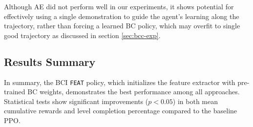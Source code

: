 \documentclass{article}
\begin{document}
Although AE did not perform well in our experiments, it shows potential 
for effectively using a single demonstration to guide the agent's 
learning along the trajectory, rather than forcing a learned BC policy, 
which may overfit to single good trajectory as discussed in section 
\ref{sec:bcc-exp}.


\subsection{Results Summary}

In summary, the BCI \texttt{FEAT} policy, which initializes the feature 
extractor with pre-trained BC weights, demonstrates the best performance 
among all approaches. Statistical tests show significant improvements 
($p < 0.05$) in both mean cumulative rewards and level completion 
percentage compared to the baseline PPO.


\begin{table}[htbp]
      \centering
      \caption{Performance of all policies.}
      \label{tab:res}
\end{table}
\end{document}
